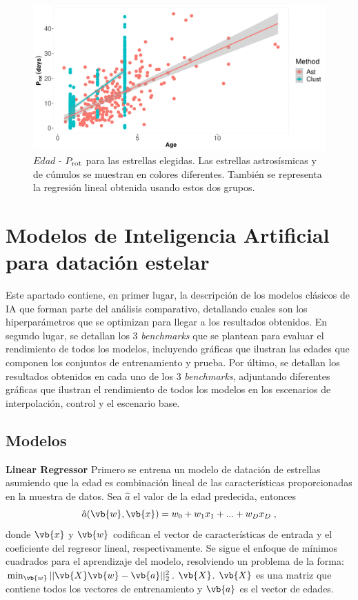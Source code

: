 \begin{figure}[H]
\begin{center}
 \includegraphics[width=0.8\linewidth]{Figuras/Age_Prot_embedded.pdf}
\end{center}
\caption{$Edad$ - $P_{\rm rot}$ para las estrellas elegidas. Las estrellas astrosísmicas y de cúmulos se muestran en colores diferentes. También se representa la regresión lineal obtenida usando estos dos grupos.}
 \label{Fig:Age_rot}
\end{figure}


\chapter{Modelos de Inteligencia Artificial para datación estelar}
\label{chap:AI_4_date} 
Este apartado contiene, en primer lugar, la descripción de los modelos clásicos de IA que forman parte del análisis comparativo, detallando cuales son los hiperparámetros que se optimizan para llegar a los resultados obtenidos. En segundo lugar, se detallan los 3 \emph{benchmarks} que se plantean para evaluar el rendimiento de todos los modelos, incluyendo gráficas que ilustran las edades que componen los conjuntos de entrenamiento y prueba. Por último, se detallan los resultados obtenidos en cada uno de los 3 \emph{benchmarks}, adjuntando diferentes gráficas que ilustran el rendimiento de todos los modelos en los escenarios de interpolación, control y el escenario base.

\section{Modelos}
\label{sec:models}

\textbf{Linear Regressor} {} Primero se entrena un modelo de datación de estrellas asumiendo que la edad es combinación lineal de las características proporcionadas en la muestra de datos. Sea $\hat{a}$ el valor de la edad predecida, entonces
\begin{equation}
\hat{a}(\vb{w}, \vb{x}) = w_0 + w_1 x_1 + ... + w_D x_D \; ,
\end{equation}
donde $\vb{x}$ y $\vb{w}$ codifican el vector de características de entrada y el coeficiente del regresor lineal, respectivamente. Se sigue el enfoque de mínimos cuadrados para el aprendizaje del modelo, resolviendo un problema de la forma: $\min_{\vb{w}} || \vb{X} \vb{w} - \vb{a}||_2^2$. $\vb{X}$. $\vb{X}$ es una matriz que contiene todos los vectores de entrenamiento y $\vb{a}$ es el vector de edades. 

